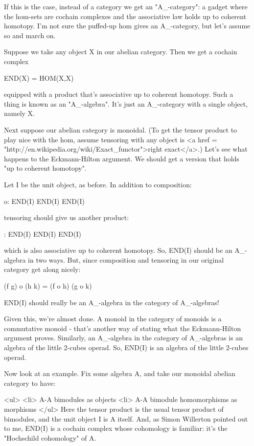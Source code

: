 If this is the case, instead of a category we get an
"A_{\infty }-category": a gadget where the hom-sets
are cochain complexes and the associative law holds up to coherent
homotopy.  I'm not sure the puffed-up hom gives an
A_{\infty }-category, but let's assume so and
march on.

Suppose we take any object X in our abelian category.  Then we get 
a cochain complex 

END(X) = HOM(X,X)

equipped with a product that's associative up to coherent 
homotopy.  Such a thing is known as an
"A_{\infty }-algebra".  It's just an
A_{\infty }-category with a single object, namely X.

Next suppose our abelian category is monoidal.  (To get the tensor 
product to play nice with the hom, assume tensoring with any object 
is <a href = "http://en.wikipedia.org/wiki/Exact_functor">right exact</a>.)  
Let's see what happens to the Eckmann-Hilton
argument.   We should get a version that holds "up to coherent
homotopy".  

Let I be the unit object, as before.  In addition to composition:

o: END(I) \times  END(I) \to  END(I)

tensoring should give us another product: 

\otimes : END(I) \times  END(I) \to  END(I)

which is also associative up to coherent homotopy.  So, END(I) should
be an A_{\infty }-algebra in two ways.  But, since composition
and tensoring in our original category get along nicely:

(f \otimes  g) o (h \otimes  k) = (f o h) \otimes  (g o k)

END(I) should really be an A_{\infty }-algebra in the category of 
A_{\infty }-algebras!

Given this, we're almost done.  A monoid in the category of monoids 
is a commutative monoid - that's another way of stating what the
Eckmann-Hilton argument proves.  Similarly, an A_{\infty }-algebra in 
the category of A_{\infty }-algebras is an algebra of the little 
2-cubes operad.  So, END(I) is an algebra of the little 2-cubes 
operad.

Now look at an example.  Fix some algebra A, and take our 
monoidal abelian category to have:

<ul>
<li>
    A-A bimodules as objects
<li>
    A-A bimodule homomorphisms as morphisms
</ul>
Here the tensor product is the usual tensor product of bimodules,
and the unit object I is A itself.  And, as Simon Willerton pointed 
out to me, END(I) is a cochain complex whose cohomology is familiar: 
it's the "Hochschild cohomology" of A.   

